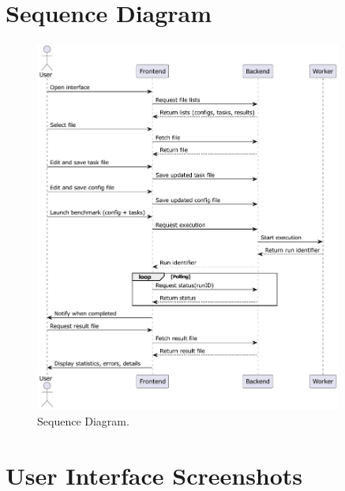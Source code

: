 \chapter{Sequence Diagram}
\label{appendix:sequence_diagram}


\begin{figure}[H]
    \includegraphics[width=0.9\textwidth]{./plantuml/sequence.pdf}
    \caption{Sequence Diagram.}
    \label{appendix:sequence}
\end{figure}

\chapter{User Interface Screenshots}
\label{appendix:ui_screenshots}

